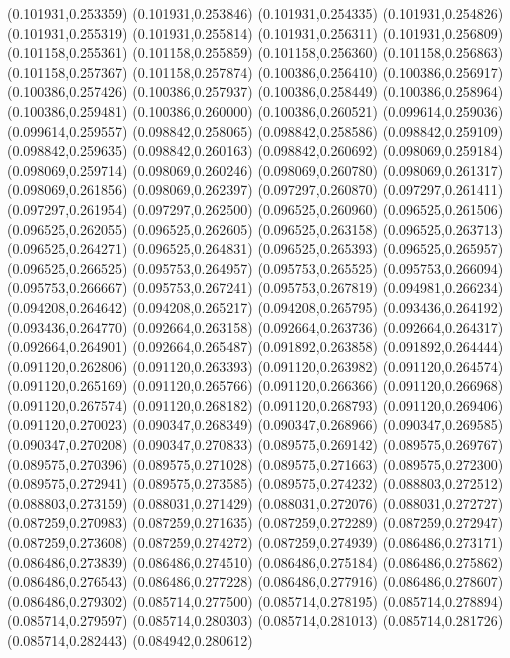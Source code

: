 (0.101931,0.253359)
(0.101931,0.253846)
(0.101931,0.254335)
(0.101931,0.254826)
(0.101931,0.255319)
(0.101931,0.255814)
(0.101931,0.256311)
(0.101931,0.256809)
(0.101158,0.255361)
(0.101158,0.255859)
(0.101158,0.256360)
(0.101158,0.256863)
(0.101158,0.257367)
(0.101158,0.257874)
(0.100386,0.256410)
(0.100386,0.256917)
(0.100386,0.257426)
(0.100386,0.257937)
(0.100386,0.258449)
(0.100386,0.258964)
(0.100386,0.259481)
(0.100386,0.260000)
(0.100386,0.260521)
(0.099614,0.259036)
(0.099614,0.259557)
(0.098842,0.258065)
(0.098842,0.258586)
(0.098842,0.259109)
(0.098842,0.259635)
(0.098842,0.260163)
(0.098842,0.260692)
(0.098069,0.259184)
(0.098069,0.259714)
(0.098069,0.260246)
(0.098069,0.260780)
(0.098069,0.261317)
(0.098069,0.261856)
(0.098069,0.262397)
(0.097297,0.260870)
(0.097297,0.261411)
(0.097297,0.261954)
(0.097297,0.262500)
(0.096525,0.260960)
(0.096525,0.261506)
(0.096525,0.262055)
(0.096525,0.262605)
(0.096525,0.263158)
(0.096525,0.263713)
(0.096525,0.264271)
(0.096525,0.264831)
(0.096525,0.265393)
(0.096525,0.265957)
(0.096525,0.266525)
(0.095753,0.264957)
(0.095753,0.265525)
(0.095753,0.266094)
(0.095753,0.266667)
(0.095753,0.267241)
(0.095753,0.267819)
(0.094981,0.266234)
(0.094208,0.264642)
(0.094208,0.265217)
(0.094208,0.265795)
(0.093436,0.264192)
(0.093436,0.264770)
(0.092664,0.263158)
(0.092664,0.263736)
(0.092664,0.264317)
(0.092664,0.264901)
(0.092664,0.265487)
(0.091892,0.263858)
(0.091892,0.264444)
(0.091120,0.262806)
(0.091120,0.263393)
(0.091120,0.263982)
(0.091120,0.264574)
(0.091120,0.265169)
(0.091120,0.265766)
(0.091120,0.266366)
(0.091120,0.266968)
(0.091120,0.267574)
(0.091120,0.268182)
(0.091120,0.268793)
(0.091120,0.269406)
(0.091120,0.270023)
(0.090347,0.268349)
(0.090347,0.268966)
(0.090347,0.269585)
(0.090347,0.270208)
(0.090347,0.270833)
(0.089575,0.269142)
(0.089575,0.269767)
(0.089575,0.270396)
(0.089575,0.271028)
(0.089575,0.271663)
(0.089575,0.272300)
(0.089575,0.272941)
(0.089575,0.273585)
(0.089575,0.274232)
(0.088803,0.272512)
(0.088803,0.273159)
(0.088031,0.271429)
(0.088031,0.272076)
(0.088031,0.272727)
(0.087259,0.270983)
(0.087259,0.271635)
(0.087259,0.272289)
(0.087259,0.272947)
(0.087259,0.273608)
(0.087259,0.274272)
(0.087259,0.274939)
(0.086486,0.273171)
(0.086486,0.273839)
(0.086486,0.274510)
(0.086486,0.275184)
(0.086486,0.275862)
(0.086486,0.276543)
(0.086486,0.277228)
(0.086486,0.277916)
(0.086486,0.278607)
(0.086486,0.279302)
(0.085714,0.277500)
(0.085714,0.278195)
(0.085714,0.278894)
(0.085714,0.279597)
(0.085714,0.280303)
(0.085714,0.281013)
(0.085714,0.281726)
(0.085714,0.282443)
(0.084942,0.280612)
